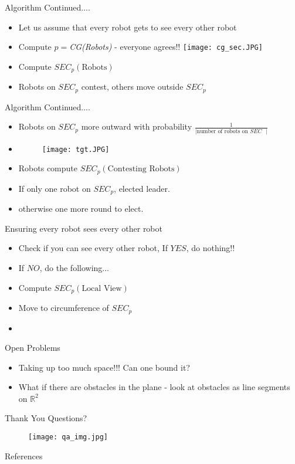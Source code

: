 \documentclass{beamer}
\begin{document}
\begin{frame}{Algorithm Continued....}
\begin{itemize}
\item Let us assume that every robot gets to see every other robot
\pause
\item Compute $p=$\emph{CG(Robots)} - everyone agrees!!
\texttt{[image: cg\_sec.JPG]}
\item Compute $SEC_p(\text{Robots})$
\item Robots on $SEC_p$ contest, others move outside $SEC_p$
\end{itemize}
\end{frame}

\begin{frame}{Algorithm Continued....}
\begin{itemize}
\item Robots on $SEC_p$ more outward with probability $\frac{1}{|\text{number of robots on $SEC$ }|}$
\pause
\item \begin{figure}[ht!]
\texttt{[image: tgt.JPG]}
\end{figure}
\pause
\item Robots compute $SEC_p(\text{Contesting Robots})$
\item If only one robot on $SEC_p$, elected leader.
\item otherwise one more round to elect.
\end{itemize}
\end{frame}

\begin{frame}{Ensuring every robot sees every other robot}
\begin{itemize}
\item Check if you can see every other robot, If $YES$, do nothing!! 
\pause
\item If $NO$, do the following...
\item Compute $SEC_p(\text{Local View})$
\item Move to circumference of $SEC_p$
\item
\end{itemize}
\end{frame}
\begin{frame}{Open Problems}
\begin{itemize}
\item Taking up too much space!!! Can one bound it? 
\pause
\item What if there are obstacles in the plane - look at obstacles as line segments on $\mathbb{R}^2$
\end{itemize}
\end{frame}

\begin{frame}{Thank You}
Questions?
\begin{figure}[ht!]
\centering
\texttt{[image: qa\_img.jpg]}
\end{figure}
\end{frame}

\begin{frame}{References}
 

\end{frame}
\end{document}
